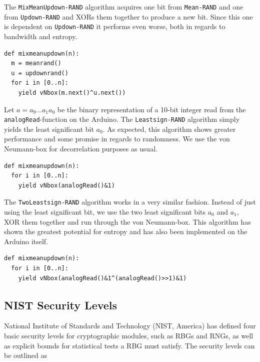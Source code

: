 \documentclass[a4paper]{article}           %
\begin{document}
The \texttt{MixMeanUpdown-RAND} algorithm acquires one bit from \texttt{Mean-RAND} and one from \texttt{Updown-RAND} and XORs them together to produce a new bit. Since this one is dependent on \texttt{Updown-RAND} it performs even worse, both in regards to bandwidth and entropy. 

\begin{lstlisting}[caption=The \texttt{MixMeanUpdown-RAND} algorithm]
def mixmeanupdown(n):
  m = meanrand()
  u = updownrand()
  for i in [0..n]:
    yield vNbox(m.next()^u.next())
\end{lstlisting}

Let $a = a_9 \ldots a_1a_0$ be the binary representation of a 10-bit integer read from the \texttt{analogRead}-function on the Arduino. The \texttt{Leastsign-RAND} algorithm simply yields the least significant bit $a_0$. As expected, this algorithm shows greater performance and some promise in regards to randomness. We use the von Neumann-box for decorrelation purposes as usual. 

\begin{lstlisting}[caption=The \texttt{Leastsign-RAND} algorithm]
def mixmeanupdown(n):
  for i in [0..n]:
    yield vNbox(analogRead()&1)
\end{lstlisting}

The \texttt{TwoLeastsign-RAND} algorithm works in a very similar fashion. Instead of just using the least significant bit, we use the two least significant bits $a_0$ and $a_1$, XOR them together and run through the von Neumann-box. This algorithm has shown the greatest potential for entropy and has also been implemented on the Arduino itself.

\begin{lstlisting}[caption=The \texttt{Leastsign-RAND} algorithm]
def mixmeanupdown(n):
  for i in [0..n]:
    yield vNbox(analogRead()&1^(analogRead()>>1)&1)
\end{lstlisting}



\subsection{NIST Security Levels}

National Institute of Standards and Technology (NIST, America) has defined\cite{fips140} four basic security levels for cryptographic modules, such as RBGs and RNGs, as well as explicit bounds for statistical tests a RBG must satisfy. The security levels can be outlined as
\end{document}
